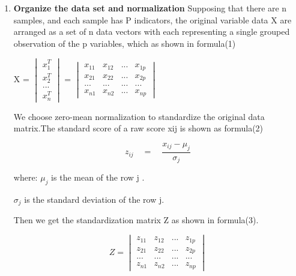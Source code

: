 \documentclass{mcmthesis}
\begin{document}
        \begin{enumerate}
          \item \textbf{Organize the data set and normalization}
          Supposing that there are n samples, and each sample has P indicators, the original variable data X are arranged as a set of n data vectors with each representing a single grouped observation of the p variables, which as shown in formula(1)





              \begin{table}[!hbpt]
                \centering
                { X } = $\begin{vmatrix} { x }_{ 1 }^{ T } \\ { x }_{ 2 }^{ T } \\ ... \\ { x }_{ n }^{ T } \end{vmatrix}$ = $\begin{vmatrix} { { x }_{ 11 } } & { x }_{ 12 } & ... & { x }_{ 1p } \\ { x }_{ 21 } & { x }_{ 22 } & ... & { x }_{ 2p } \\ ... & ... & ... & ... \\ { x }_{ n1 } & { x }_{ n2 } & ... & { x }_{ np } \end{vmatrix}$              \end{table}

              We choose zero-mean normalization to standardize the original data matrix.The standard score of a raw score xij is shown as formula(2)

             \begin{table}[!hbpt]
               \centering
               $${ z }_{ ij }\quad =\quad \frac { { x }_{ ij }-\mu_{j}  }{ \sigma_{j}  }$$
             \end{table}

             where:
             $\mu_{j}$ is the mean of the row j .

             $\sigma_{j}$ is the standard deviation of the row j.

             Then we get the standardization matrix Z as shown in formula(3).

             \begin{table}[!hbpt]
               \centering
               $${ Z }=\begin{vmatrix} { { z }_{ 11 } } & { z }_{ 12 } & ... & { z }_{ 1p } \\ { z }_{ 21 } & { z }_{ 22 } & ... & { z }_{ 2p } \\ ... & ... & ... & ... \\ { z }_{ n1 } & { z }_{ n2 } & ... & { z }_{ np } \end{vmatrix}$$
             \end{table}



\end{enumerate}
\end{document}

